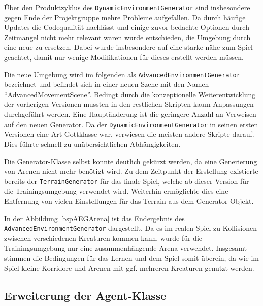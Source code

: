 Über den Produktzyklus des \texttt{DynamicEnvironmentGenerator} sind insbesondere gegen Ende der Projektgruppe mehre Probleme aufgefallen. Da durch häufige Updates die Codequalität nachlässt und einige zuvor bedachte Optionen durch Zeitmangel nicht mehr relevant waren wurde entschieden, die Umgebung durch eine neue zu ersetzen. Dabei wurde insbesondere auf eine starke nähe zum Spiel geachtet, damit nur wenige Modifikationen für dieses erstellt werden müssen.

Die neue Umgebung wird im folgenden als \texttt{AdvancedEnvironmentGenerator} bezeichnet und befindet sich in einer neuen Szene mit den Namen \enquote{AdvancedMovementScene}. Bedingt durch die konzeptionelle Weiterentwicklung der vorherigen Versionen mussten in den restlichen Skripten kaum Anpassungen durchgeführt werden. Eine Hauptänderung ist die geringere Anzahl an Verweisen auf den neuen Generator. Da der \texttt{DynamicEnvironmentGenerator} in seinen ersten Versionen eine Art Gottklasse war, verwiesen die meisten andere Skripte darauf. Dies führte schnell zu unübersichtlichen Abhängigkeiten.

Die Generator-Klasse selbst konnte deutlich gekürzt werden, da eine Generierung von Arenen nicht mehr benötigt wird. Zu dem Zeitpunkt der Erstellung existierte bereits der \texttt{TerrainGenerator} für das finale Spiel, welche ab dieser Version für die Trainingsumgebung verwendet wird. Weiterhin ermöglichte dies eine Entfernung von vielen Einstellungen für das Terrain aus dem Generator-Objekt.

In der Abbildung \ref{bspAEGArena} ist das Endergebnis des \texttt{AdvancedEnvironmentGenerator} dargestellt. Da es im realen Spiel zu Kollisionen zwischen verschiedenen Kreaturen kommen kann, wurde für die Trainingsumgebung nur eine zusammenhängende Arena verwendet. Insgesamt stimmen die Bedingungen für das Lernen und dem Spiel somit überein, da wie im Spiel kleine Korridore und Arenen mit ggf. mehreren Kreaturen genutzt werden.
\subsection{Erweiterung der Agent-Klasse}

